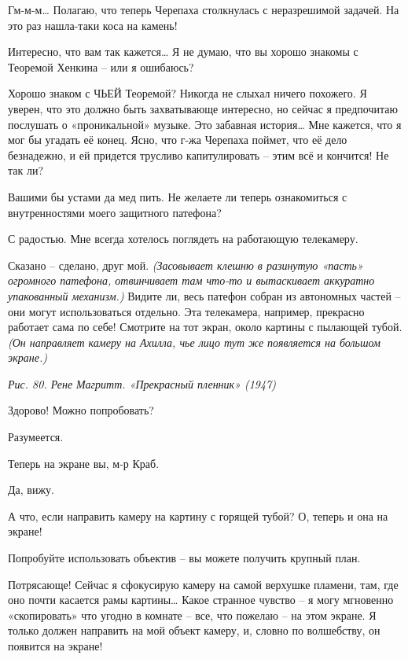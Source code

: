 \documentclass[../main.tex]{subfiles}
\begin{document}
\begin{dialogue}
 Гм-м-м\ldots{} Полагаю, что теперь Черепаха столкнулась с неразрешимой задачей. На это раз нашла-таки коса на камень!

 Интересно, что вам так кажется\ldots{} Я не думаю, что вы хорошо знакомы с Теоремой Хенкина \--- или я ошибаюсь?

 Хорошо знаком с ЧЬЕЙ Теоремой? Никогда не слыхал ничего похожего. Я уверен, что это должно быть захватывающе интересно, но сейчас я предпочитаю послушать о «проникальной» музыке. Это забавная история\ldots{} Мне кажется, что я мог бы угадать её конец. Ясно, что г-жа Черепаха поймет, что её дело безнадежно, и ей придется трусливо капитулировать \--- этим всё и кончится! Не так ли?

 Вашими бы устами да мед пить. Не желаете ли теперь ознакомиться с внутренностями моего защитного патефона?

 С радостью. Мне всегда хотелось поглядеть на работающую телекамеру.

 Сказано \--- сделано, друг мой. \emph{(Засовывает клешню в разинутую «пасть» огромного патефона, отвинчивает там что-то и вытаскивает аккуратно упакованный механизм.)} Видите ли, весь патефон собран из автономных частей \--- они могут использоваться отдельно. Эта телекамера, например, прекрасно работает сама по себе! Смотрите на тот экран, около картины с пылающей тубой. \emph{(Он направляет камеру на Ахилла, чье лицо тут же появляется на большом экране.)}

\emph{Рис. 80. Рене Магритт. «Прекрасный пленник» (1947)}

 Здорово! Можно попробовать?

 Разумеется.

 Теперь на экране вы, м-р Краб.

 Да, вижу.

 А что, если направить камеру на картину с горящей тубой? О, теперь и она на экране!

 Попробуйте использовать объектив \--- вы можете получить крупный план.

 Потрясающе! Сейчас я сфокусирую камеру на самой верхушке пламени, там, где оно почти касается рамы картины\ldots{} Какое странное чувство \--- я могу мгновенно «скопировать» что угодно в комнате \--- все, что пожелаю \--- на этом экране. Я только должен направить на мой объект камеру, и, словно по волшебству, он появится на экране!


\end{dialogue}
\end{document}
